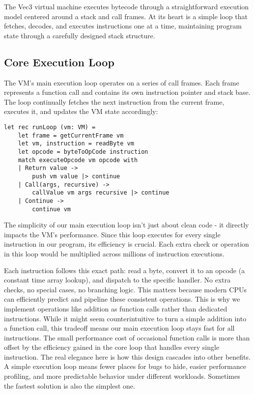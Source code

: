 The Vec3 virtual machine executes bytecode through a straightforward execution model centered around a stack and call frames. 
At its heart is a simple loop that fetches, decodes, and executes instructions one at a time, maintaining program state through a carefully designed stack structure.

\subsection{Core Execution Loop}

The VM's main execution loop operates on a series of call frames. Each frame represents a function call and contains its own instruction pointer and stack base. The loop continually fetches the next instruction from the current frame, executes it, and updates the VM state accordingly:

\begin{verbatim}
let rec runLoop (vm: VM) =
    let frame = getCurrentFrame vm
    let vm, instruction = readByte vm
    let opcode = byteToOpCode instruction
    match executeOpcode vm opcode with
    | Return value -> 
        push vm value |> continue
    | Call(args, recursive) ->
        callValue vm args recursive |> continue
    | Continue -> 
        continue vm
\end{verbatim}

The simplicity of our main execution loop isn't just about clean code - it directly impacts the VM's performance. Since this loop executes for every single instruction in our program, its efficiency is crucial. Each extra check or operation in this loop would be multiplied across millions of instruction executions.

Each instruction follows this exact path: read a byte, convert it to an opcode (a constant time array lookup), and dispatch to the specific handler. No extra checks, no special cases, no branching logic. This matters because modern CPUs can efficiently predict and pipeline these consistent operations.
This is why we implement operations like addition as function calls rather than dedicated instructions. While it might seem counterintuitive to turn a simple addition into a function call, this tradeoff means our main execution loop stays fast for all instructions. The small performance cost of occasional function calls is more than offset by the efficiency gained in the core loop that handles every single instruction.
The real elegance here is how this design cascades into other benefits. A simple execution loop means fewer places for bugs to hide, easier performance profiling, and more predictable behavior under different workloads. Sometimes the fastest solution is also the simplest one.


